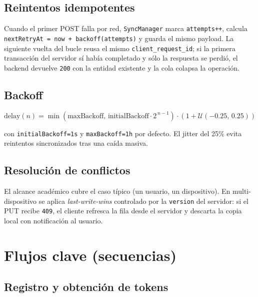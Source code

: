 \documentclass[11pt,a4paper]{article}
\newcommand{\cls}[1]{\texttt{\small #1}}
\begin{document}
\subsection{Reintentos idempotentes}

Cuando el primer POST falla por red, \cls{SyncManager} marca \texttt{attempts++}, calcula \texttt{nextRetryAt = now + backoff(attempts)} y guarda el mismo payload. La siguiente vuelta del bucle reusa el mismo \texttt{client\_request\_id}; si la primera transacción del servidor sí había completado y sólo la respuesta se perdió, el backend devuelve \texttt{200} con la entidad existente y la cola colapsa la operación.

\subsection{Backoff}

\[
\text{delay}(n) = \min(\text{maxBackoff},\, \text{initialBackoff} \cdot 2^{\,n-1}) \cdot (1 + \mathcal{U}(-0.25,\,0.25))
\]

con \texttt{initialBackoff=1s} y \texttt{maxBackoff=1h} por defecto. El jitter del 25\% evita reintentos sincronizados tras una caída masiva.

\subsection{Resolución de conflictos}

El alcance académico cubre el caso típico (un usuario, un dispositivo). En multi-dispositivo se aplica \textit{last-write-wins} controlado por la \texttt{version} del servidor: si el PUT recibe \texttt{409}, el cliente refresca la fila desde el servidor y descarta la copia local con notificación al usuario.

\section{Flujos clave (secuencias)}

\subsection{Registro y obtención de tokens}
\end{document}
